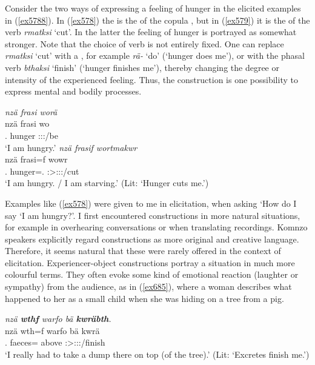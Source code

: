 Consider the two ways of expressing a feeling of hunger in the elicited examples in (\ref{ex5788}). In (\ref{ex578}) the  is the  of the copula , but in (\ref{ex579}) it is the  of the verb \emph{rmatksi} `cut'. In the latter the feeling of hunger is portrayed as somewhat stronger. Note that the choice of verb is not entirely fixed. One can replace \emph{rmatksi} `cut' with a , for example \emph{rä-} `do' (`hunger does me'), or with the phasal verb \emph{bthaksi} `finish' (`hunger finishes me'), thereby changing the degree or intensity of the experienced feeling. Thus, the  construction is one possibility to express mental and bodily processes.

\begin{exe}
	\ex
	\label{ex5788}
	\begin{xlist}
	\ex \emph{nzä frasi worä}\\
	\gll nzä frasi wo\\
	\Fsg.{\Abs} hunger \Fsg:\Sbj:\Nonpast:\Ipfv/be\\
	\trans `I am hungry.'
	\label{ex578}
	\ex \emph{nzä frasif wortmakwr}\\
	\gll nzä frasi=f wowr\\
	\Fsg.{\Abs} hunger=\Erg.{} \Stsg:\Sbj>\Fsg:\Obj:\Nonpast:\Ipfv/cut\\
	\trans `I am hungry. / I am starving.' (Lit: `Hunger cuts me.')
	\label{ex579}
	\end{xlist}
\end{exe}

Examples like (\ref{ex578}) were given to me in elicitation, when asking `How do I say `I am hungry?'. I first encountered  constructions in more natural situations, for example in overhearing conversations or when translating recordings. Komnzo speakers explicitly regard  constructions as more original and creative language. Therefore, it seems natural that these were rarely offered in the context of elicitation. Experiencer-object constructions portray a situation in much more colourful terms. They often evoke some kind of emotional reaction (laughter or sympathy) from the audience, as in (\ref{ex685}), where a woman describes what happened to her as a small child when she was hiding on a tree from a pig.

\begin{exe}
	\ex \emph{nzä \textbf{wthf} warfo bä \textbf{kwräbth}.}\\
	\gll nzä wth=f warfo bä kwrä\\
	\Fsg.{\Abs} faeces={\Erg} above \Med{} \Stsg:\Sbj>\Fsg:\Obj:\Irr:\Pfv/finish\\
	\trans `I really had to take a dump there on top (of the tree).' (Lit: `Excretes finish me.')
	\label{ex685}
\end{exe}

